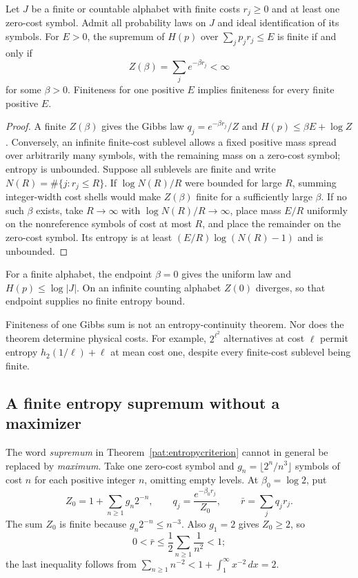 \begin{theorem}
\label{pat:entropycriterion}
Let $J$ be a finite or countable alphabet with finite costs $r_j\ge0$ and at least one zero-cost symbol. Admit all probability laws on $J$ and ideal identification of its symbols. For $E>0$, the supremum of $H(p)$ over $\sum_jp_jr_j\le E$ is finite if and only if
\[
 Z(\beta)=\sum_j e^{-\beta r_j}<\infty
\]
for some $\beta>0$. Finiteness for one positive $E$ implies finiteness for every finite positive $E$.
\end{theorem}
\begin{proof}
A finite $Z(\beta)$ gives the Gibbs law $q_j=e^{-\beta r_j}/Z$ and $H(p)\le\beta E+\log Z$. Conversely, an infinite finite-cost sublevel allows a fixed positive mass spread over arbitrarily many symbols, with the remaining mass on a zero-cost symbol; entropy is unbounded. Suppose all sublevels are finite and write $N(R)=\#\{j:r_j\le R\}$. If $\log N(R)/R$ were bounded for large $R$, summing integer-width cost shells would make $Z(\beta)$ finite for a sufficiently large $\beta$. If no such $\beta$ exists, take $R\to\infty$ with $\log N(R)/R\to\infty$, place mass $E/R$ uniformly on the nonreference symbols of cost at most $R$, and place the remainder on the zero-cost symbol. Its entropy is at least $(E/R)\log(N(R)-1)$ and is unbounded.
\end{proof}
For a finite alphabet, the endpoint $\beta=0$ gives the uniform law and $H(p)\le\log|J|$. On an infinite counting alphabet $Z(0)$ diverges, so that endpoint supplies no finite entropy bound.

Finiteness of one Gibbs sum is not an entropy-continuity theorem. Nor does the theorem determine physical costs. For example, $2^{\ell^2}$ alternatives at cost $\ell$ permit entropy $h_2(1/\ell)+\ell$ at mean cost one, despite every finite-cost sublevel being finite.

\subsection{A finite entropy supremum without a maximizer}
\label{pat:nonattainment}

The word \emph{supremum} in Theorem~\ref{pat:entropycriterion} cannot in general be replaced by \emph{maximum}. Take one zero-cost symbol and $g_n=\lfloor2^n/n^3\rfloor$ symbols of cost $n$ for each positive integer $n$, omitting empty levels. At $\beta_0=\log2$, put
\[
 Z_0=1+\sum_{n\ge1}g_n2^{-n},\qquad
 q_j=\frac{e^{-\beta_0r_j}}{Z_0},\qquad
 \bar r=\sum_jq_jr_j.
\]
The sum $Z_0$ is finite because $g_n2^{-n}\le n^{-3}$. Also $g_1=2$ gives $Z_0\ge2$, so
\[
 0<\bar r\le\frac12\sum_{n\ge1}\frac1{n^2}<1;
\]
the last inequality follows from $\sum_{n\ge1}n^{-2}<1+\int_1^\infty x^{-2}\,dx=2$.

